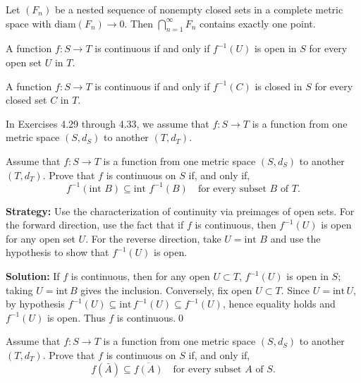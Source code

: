 \begin{theorem}
Let $(F_n)$ be a nested sequence of nonempty closed sets in a complete metric space with $\text{diam}(F_n) \to 0$. Then $\bigcap_{n=1}^{\infty} F_n$ contains exactly one point.
\end{theorem}

\begin{theorem}
A function $f: S \to T$ is continuous if and only if $f^{-1}(U)$ is open in $S$ for every open set $U$ in $T$.
\end{theorem}

\begin{theorem}
A function $f: S \to T$ is continuous if and only if $f^{-1}(C)$ is closed in $S$ for every closed set $C$ in $T$.
\end{theorem}

In Exercises 4.29 through 4.33, we assume that $f:S\to T$ is a function from one metric space $(S,d_S)$ to another $(T,d_T)$.



\begin{problembox}
\begin{problemstatement}
Assume that $f : S \rightarrow T$ is a function from one metric space $(S, d_S)$ to another $(T, d_T)$. Prove that $f$ is continuous on $S$ if, and only if,
\[ f^{-1}(\text{int } B) \subseteq \text{int } f^{-1}(B) \quad \text{for every subset } B \text{ of } T. \]
\end{problemstatement}
\end{problembox}

\noindent\textbf{Strategy:} Use the characterization of continuity via preimages of open sets. For the forward direction, use the fact that if $f$ is continuous, then $f^{-1}(U)$ is open for any open set $U$. For the reverse direction, take $U = \text{int } B$ and use the hypothesis to show that $f^{-1}(U)$ is open.

\bigskip\noindent\textbf{Solution:}
If $f$ is continuous, then for any open $U\subset T$, $f^{-1}(U)$ is open in $S$; taking $U=\mathrm{int}\,B$ gives the inclusion. Conversely, fix open $U\subset T$. Since $U=\mathrm{int}\,U$, by hypothesis $f^{-1}(U)\subseteq\mathrm{int}\,f^{-1}(U)\subseteq f^{-1}(U)$, hence equality holds and $f^{-1}(U)$ is open. Thus $f$ is continuous.\qed



\begin{problembox}
\begin{problemstatement}
Assume that $f : S \rightarrow T$ is a function from one metric space $(S, d_S)$ to another $(T, d_T)$. Prove that $f$ is continuous on $S$ if, and only if,
\[ f(\bar{A}) \subseteq \overline{f(A)} \quad \text{for every subset } A \text{ of } S. \]
\end{problemstatement}
\end{problembox}

